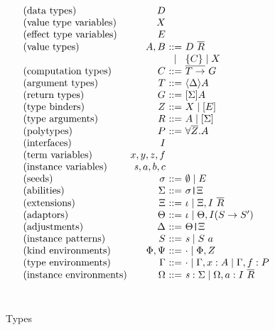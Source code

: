 \documentclass[msc,deptreport,cs]{infthesis} %
\makeatletter
\newcommand{\many}{\overline}
\newcommand\ba{\begin{array}}
\newcommand\ea{\end{array}}
\newenvironment{syn}{\ba{@{}l@{~}r@{~}c@{~}l@{}}}{\ea}
\newcommand{\adj}{\Delta}
\newcommand{\adapt}{\Theta}
\newcommand{\ext}{\Xi}
\newcommand{\sigs}{\Sigma}
\newcommand{\sig}{I}
\newcommand{\seed}{\sigma}
\newcommand{\var}{\mathit}        %
\newcommand{\thunk}[1]{\{{#1}\}}
\newcommand{\snoc}{\ }
\newcommand\slab[1]{(\textrm{#1})}
\newcommand{\ev}{E}
\newcommand{\effin}[1]{\langle {#1} \rangle}
\newcommand{\effout}[1]{[{#1}]}
\newcommand{\nowt}{\emptyset}
\newcommand{\id}{\iota}
\newcommand{\pid}{\var{s}} %
\newcommand{\kenv}{\Phi}  %
\newcommand{\kenva}{\Psi} %
\newcommand{\ienv}{\Omega} %
\newcommand{\gor}{\mid}
\newcommand{\pipe}{\texttt{|}}
\makeatother
\begin{document}
\begin{figure}  %
\[
\ba{@{}c@{}}
\ba{@{}c@{\quad\quad}c@{}}
\begin{syn}
  \slab{data types}            & D \\
  \slab{value type variables}  & X \\
  \slab{effect type variables} & E \\
  \slab{value types}           & A, B   &::= & D~\overline{R} \\
                               &        &\gor& \thunk{C} \gor X \\
  \slab{computation types}     & C      &::= & \many{T \to}~G \\
  \slab{argument types}        & T      &::= & \effin{\adj}A \\
  \slab{return types}          & G      &::= & \effout{\sigs}A \\

  \slab{type binders}          & Z      &::= & X \gor [E]\\
  \slab{type arguments}        & R      &::= & A \gor [\Sigma]\\
  \slab{polytypes}             & P      &::= & \forall \overline{Z}.A \\
  \slab{interfaces}           & I \\
  \slab{term variables}       & x, y, z, f \\
  \slab{instance variables}   & \pid, a, b, c \\
  \slab{seeds}                & \seed  &::= & \nowt \gor \ev \\
  \slab{abilities}            & \sigs  &::= & \seed\pipe\ext \\
  \slab{extensions}           & \ext   &::= & \id \gor \ext, \sig~\many{R} \\
  \slab{adaptors}             & \adapt &::= & \id \gor \adapt, \sig(S \to S') \\
  \slab{adjustments}          & \adj   &::= & \adapt\pipe\ext \\
  \slab{instance patterns}    & S      &::= & \pid \gor S \snoc a \\
  \slab{kind environments}    & \kenv,
                                \kenva &::= & \cdot \gor \kenv, Z \\
  \slab{type environments}    & \Gamma &::= & \cdot \gor \Gamma, x:A %
                                              \gor \Gamma, f:P\\
 \slab{instance environments} & \ienv  &::= & \pid:\sigs \gor \ienv, a:\sig~\many{R}\\
\end{syn} \\
\ea \\
\ea
\]
\\[0.25cm]

\caption{Types}
\label{fig:types}
\end{figure}
\end{document}
